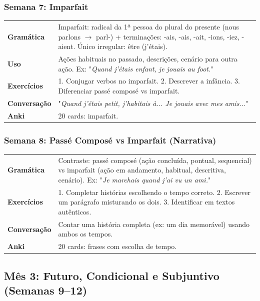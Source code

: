 \documentclass[a4paper,12pt]{article}
\begin{document}
\subsubsection*{Semana 7: Imparfait}
\begin{tabularx}{\linewidth}{>{\bfseries}l L}
    Gramática & Imparfait: radical da 1ª pessoa do plural do presente (nous parlons $\to$ parl-) + terminações: -ais, -ais, -ait, -ions, -iez, -aient. Único irregular: être (j'étais). \\
    Uso & Ações habituais no passado, descrições, cenário para outra ação. Ex: "\emph{Quand j'étais enfant, je jouais au foot.}" \\
    Exercícios & 1. Conjugar verbos no imparfait. 2. Descrever a infância. 3. Diferenciar passé composé vs imparfait. \\
    Conversação & "\emph{Quand j'étais petit, j'habitais à... Je jouais avec mes amis...}" \\
    Anki & 20 cards: imparfait. \\
\end{tabularx}

\subsubsection*{Semana 8: Passé Composé vs Imparfait (Narrativa)}
\begin{tabularx}{\linewidth}{>{\bfseries}l L}
    Gramática & Contraste: passé composé (ação concluída, pontual, sequencial) vs imparfait (ação em andamento, habitual, descritiva, cenário). Ex: "\emph{Je marchais quand j'ai vu un ami.}" \\
    Exercícios & 1. Completar histórias escolhendo o tempo correto. 2. Escrever um parágrafo misturando os dois. 3. Identificar em textos autênticos. \\
    Conversação & Contar uma história completa (ex: um dia memorável) usando ambos os tempos. \\
    Anki & 20 cards: frases com escolha de tempo. \\
\end{tabularx}

\subsection{Mês 3: Futuro, Condicional e Subjuntivo (Semanas 9–12)}
\end{document}
